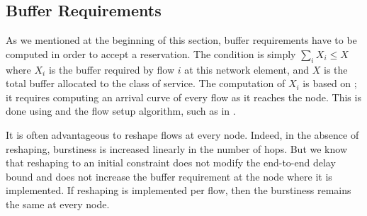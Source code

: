\subsection{Buffer Requirements}

As we mentioned at the beginning of this section, buffer
requirements have to be computed in order to accept a reservation.
The condition is simply $\sum_i X_i \leq X$ where $X_i$ is the
buffer required by flow $i$ at this network element, and $X$ is
the total buffer allocated to the class of service. The
computation of $X_i$ is based on ; it
requires computing an arrival curve of every flow as it reaches
the node. This is done using  and the flow
setup algorithm, such as in .

It is often advantageous to reshape flows at every node. Indeed,
in the absence of reshaping, burstiness is increased linearly in
the number of hops. But we know that reshaping to an initial
constraint does not modify the end-to-end delay bound and does not
increase the buffer requirement at the node where it is
implemented. If reshaping is implemented per flow, then the
burstiness remains the same at every node.


%
%
%

%
%
%
%
%
%
%
%
%
%
%
%
%
%
%
%
%
%
%
%
%
%
